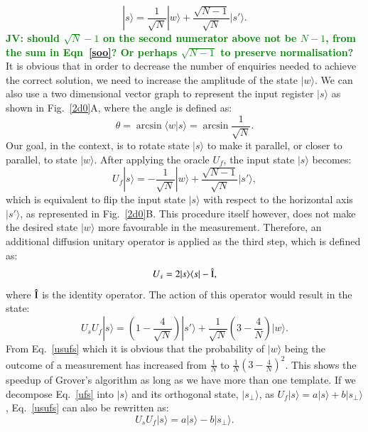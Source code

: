 \documentclass[aps,prd,nofootinbib,twocolumn,reprint,superscriptaddress,showpacs,showkeys,longbibliography]{revtex4-1}
\newcommand{\bra}[1]{\langle #1|}
\newcommand{\ket}[1]{|#1\rangle}
\newcommand{\braket}[2]{\langle #1|#2\rangle}
\newcommand{\jv}[1]{\textbf{\textcolor{green}{JV: #1}}}
\begin{document}
\begin{equation}
    \label{so}
    \ket{s}=\frac{1}{\sqrt{N}}\ket{w}+\frac{\sqrt{N-1}}{\sqrt{N}}\ket{s'}.
\end{equation}
\jv{should $\sqrt{N}-1$ on the second numerator above not be $N-1$, from the sum in Eqn~\ref{soo}? Or perhaps $\sqrt{N-1}$ to preserve normalisation?}
It is obvious that in order to decrease the number of enquiries needed to achieve the correct solution, we need to increase the amplitude of the state $\ket{w}$. We can also use a two dimensional vector graph to represent the input register $\ket{s}$ as shown in Fig.~\ref{2d0}A, where the angle is defined as:
\begin{equation}
\label{theta}
   \theta=\arcsin\braket{w}{s} = \arcsin {\frac{1}{\sqrt{N}}}.
\end{equation}
Our goal, in the context, is to rotate state $\ket{s}$ to make it parallel, or closer to parallel, to state $\ket{w}$. After applying the oracle $U_f$, the input state $\ket{s}$ becomes:
\begin{equation}
    \label{ufs}
    U_f\ket{s}=-\frac{1}{\sqrt{N}}\ket{w}+\frac{\sqrt{N-1}}{\sqrt{N}}\ket{s'},
\end{equation}
which is equivalent to flip the input state $\ket{s}$ with respect to the horizontal axis $\ket{s'}$, as represented in Fig.~\ref{2d0}B. This procedure itself however, does not make the desired state $\ket{w}$ more favourable in the measurement. Therefore, an additional diffusion unitary operator is applied as the third step, which is defined as:
\begin{equation}
    \label{Us}
    U_s=2\ket{s}\bra{s}-\hat{\rm I},
\end{equation}
where $\hat{\rm I}$ is the identity operator. The action of this operator would result in the state:
\begin{equation}
    \label{usufs}
    U_sU_f\ket{s}=(1-\frac{4}{\sqrt{N}})\ket{s'}+\frac{1}{\sqrt{N}}(3-\frac{4}{N})\ket{w}.
\end{equation}
From Eq.~\ref{usufs} which it is obvious that the probability of $\ket{w}$ being the outcome of a measurement has increased from $\frac{1}{N}$ to $\frac{1}{N}(3-\frac{4}{N})^2$. This shows the speedup of Grover's algorithm as long as we have more than one template. If we decompose Eq.~\ref{ufs} into $\ket{s}$ and its orthogonal state, $\ket{s_\perp}$, as $U_f\ket{s}=a\ket{s}+b\ket{s_\perp}$, Eq.~\ref{usufs} can also be rewritten as:
\begin{equation}
    \label{usufsp}
    U_sU_f\ket{s}=a\ket{s}-b\ket{s_\perp}.
\end{equation}
\end{document}
